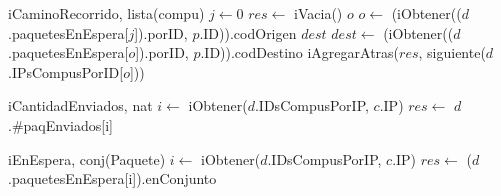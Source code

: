 \begin{Algoritmos}
  \begin{algoritmo}{iCaminoRecorrido}{, }{lista(compu)}
     $j \gets 0$\;
    $res \gets$ iVacia()\;
     $o$\;
    $o \gets$ (iObtener(($d$.paquetesEnEspera[$j$]).porID, $p$.ID)).codOrigen\;
     $dest$\;
    $dest \gets$ (iObtener(($d$.paquetesEnEspera[$o$]).porID, $p$.ID)).codDestino\;
    iAgregarAtras($res$, siguiente($d$.IPsCompusPorID[$o$]))\;
  \end{algoritmo} 

  \begin{algoritmo}{iCantidadEnviados}{, }{nat}
     $i \gets$ iObtener($d$.IDsCompusPorIP, $c$.IP)\;
    $res \gets$ $d$.\#paqEnviados[i]\;
  \end{algoritmo}

  \begin{algoritmo}{iEnEspera}{, }{conj(Paquete)}
     $i \gets$ iObtener($d$.IDsCompusPorIP, $c$.IP)\;
    $res \gets$ ($d$.paquetesEnEspera[i]).enConjunto\;
  \end{algoritmo}

\end{Algoritmos}

